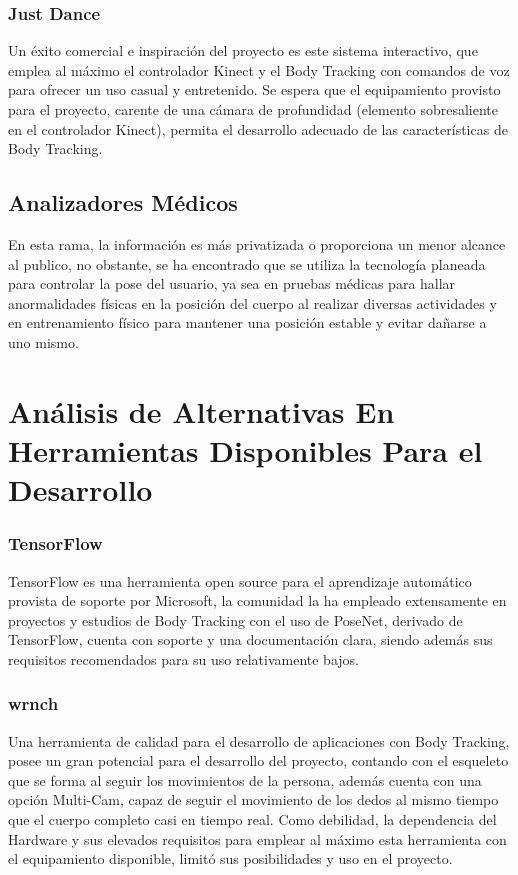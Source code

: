 \subsubsection{Just Dance}

Un éxito comercial e inspiración del proyecto es este sistema interactivo, que emplea al máximo el controlador Kinect y el Body Tracking con comandos de voz para ofrecer un uso casual y entretenido. Se espera que el equipamiento provisto para el proyecto, carente de una cámara de profundidad (elemento sobresaliente en el controlador Kinect), permita el desarrollo adecuado de las características de Body Tracking.

\subsection{Analizadores Médicos}

En esta rama, la información es más privatizada o proporciona un menor alcance al publico, no obstante, se ha encontrado que se utiliza la tecnología planeada para controlar la pose del usuario, ya sea en pruebas médicas para hallar anormalidades físicas en la posición del cuerpo al realizar diversas actividades y en entrenamiento físico para mantener una posición estable y evitar dañarse a uno mismo.

\section{Análisis de Alternativas En Herramientas Disponibles Para el Desarrollo}


\subsubsection{TensorFlow}

TensorFlow es una herramienta open source para el aprendizaje automático provista de soporte por Microsoft, la comunidad la ha empleado extensamente en proyectos y estudios de Body Tracking con el uso de PoseNet, derivado de TensorFlow, cuenta con soporte y una documentación clara, siendo además sus requisitos recomendados para su uso relativamente bajos.

\subsubsection{wrnch}

Una herramienta de calidad para el desarrollo de aplicaciones con Body Tracking, posee un gran potencial para el desarrollo del proyecto, contando con el esqueleto que se forma al seguir los movimientos de la persona, además cuenta con una opción Multi-Cam, capaz de seguir el movimiento de los dedos al mismo tiempo que el cuerpo completo casi en tiempo real. Como debilidad, la dependencia del Hardware y sus elevados requisitos para emplear al máximo esta herramienta con el equipamiento disponible, limitó sus posibilidades y uso en el proyecto.





